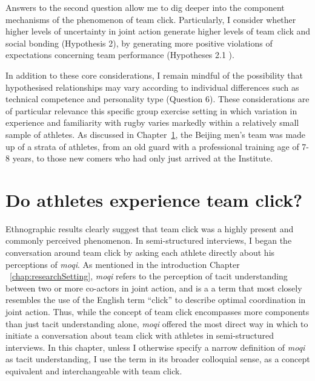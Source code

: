 \begin{CJK}{UTF8}{gbsn}
Answers to the second question allow me to dig deeper into the component mechanisms of the phenomenon of team click.  Particularly, I consider whether higher levels of uncertainty in joint action generate higher levels of team click and social bonding (Hypothesis 2), by generating more positive violations of expectations concerning team performance (Hypotheses 2.1 ).

In addition to these core considerations, I remain mindful of the possibility that hypothesised relationships may vary according to individual differences such as technical competence and personality type (Question 6).  These considerations are of particular relevance this specific group exercise setting in which variation in experience and familiarity with rugby varies markedly within a relatively small sample of athletes.  As discussed in Chapter~\ref{}, the Beijing men's team was made up of a strata of athletes, from an old guard with a professional training age of 7-8 years, to those new comers who had only just arrived at the Institute.



\section{Do athletes experience team click?}
Ethnographic results clearly suggest that team click was a highly present and commonly perceived phenomenon.   In semi-structured interviews, I began the conversation around team click by asking each athlete directly about his perceptions of \textit{moqi}.  As mentioned in the introduction Chapter ~\ref{chap:researchSetting}, \textit{moqi} refers to the perception of tacit understanding between two or more co-actors in joint action, and is a a term that most closely resembles the use of the English term ``click'' to describe optimal coordination in joint action.  Thus, while the concept of team click encompasses more components than just tacit understanding alone, \textit{moqi} offered the most direct way in which to initiate a conversation about team click with athletes in semi-structured interviews.  In this chapter, unless I otherwise specify a narrow definition of \textit{moqi} as tacit understanding, I use the term in its broader colloquial sense, as a concept equivalent and interchangeable with team click.


\end{CJK}
